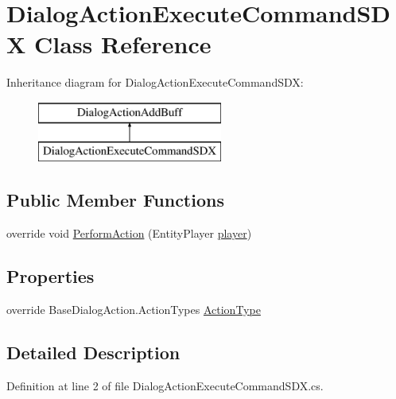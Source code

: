 \hypertarget{class_dialog_action_execute_command_s_d_x}{}\section{Dialog\+Action\+Execute\+Command\+S\+DX Class Reference}
\label{class_dialog_action_execute_command_s_d_x}
Inheritance diagram for Dialog\+Action\+Execute\+Command\+S\+DX\+:\begin{figure}[H]
\begin{center}
\leavevmode
\includegraphics[height=2.000000cm]{class_dialog_action_execute_command_s_d_x}
\end{center}
\end{figure}
\subsection*{Public Member Functions}
\begin{DoxyCompactItemize}
\item 
override void \mbox{\hyperlink{class_dialog_action_execute_command_s_d_x_a97c8e46376e72ed90822f68886dd52ba}{Perform\+Action}} (Entity\+Player \mbox{\hyperlink{_sphere_i_i_01_music_01_boxes_2_config_2_localization_8txt_a4e2cb8aeff651600ea1cc57fe5a929a4}{player}})
\end{DoxyCompactItemize}
\subsection*{Properties}
\begin{DoxyCompactItemize}
\item 
override Base\+Dialog\+Action.\+Action\+Types \mbox{\hyperlink{class_dialog_action_execute_command_s_d_x_ad7651451453eaace529347a8f1a61213}{Action\+Type}}
\end{DoxyCompactItemize}


\subsection{Detailed Description}


Definition at line 2 of file Dialog\+Action\+Execute\+Command\+S\+D\+X.\+cs.



